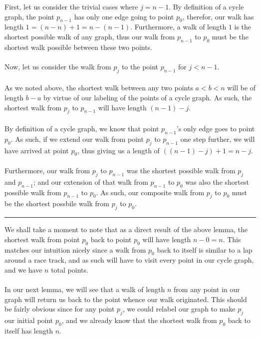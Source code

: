 \documentclass[a4paper,12pt]{article}
\begin{document}
First, let us consider the trivial cases where $j = n - 1$. By definition of a cycle graph, the point $p_{n-1}$ has only one edge going to point $p_0$, therefor, our walk has length $1 = (n - n) + 1 = n - (n - 1)$. Furthermore, a walk of length $1$ is the shortest possible walk of any graph, thus our walk from $p_{n-1}$ to $p_0$ must be the shortest walk possible between these two points.\\
\\ 
Now, let us consider the walk from $p_j$ to the point $p_{n-1}$ for $j < n - 1$.\\
\\
As we noted above, the shortest walk between any two points $a < b < n$ will be of length $b - a$ by virtue of our labeling of the points of a cycle graph. As such, the shortest walk from $p_j$ to $p_{n-1}$ will have length $(n - 1) - j$.\\
\\
By definition of a cycle graph, we know that point $p_{n-1}$'s only edge goes to point $p_0$. As such, if we extend our walk from point $p_j$ to $p_{n-1}$ one step further, we will have arrived at point $p_0$, thus giving us a length of $((n - 1) - j) + 1 = n - j$.\\
\\
Furthermore, our walk from $p_j$ to $p_{n-1}$ was the shortest possible walk from $p_j$ and $p_{n-1}$; and our extension of that walk from $p_{n-1}$ to $p_0$ was also the shortest possible walk from $p_{n-1}$ to $p_0$. As such, our composite walk from $p_j$ to $p_0$ must be the shortest possbile walk from $p_j$ to $p_0$.
\begin{center}
\noindent\rule{8cm}{0.4pt}
\end{center} 
\noindent
We shall take a moment to note that as a direct result of the above lemma, the shortest walk from point $p_0$ back to point $p_0$ will have length $n - 0 = n$. This matches our intuition nicely since a walk from $p_0$ back to itself is similar to a lap around a race track, and as such will have to visit every point in our cycle graph, and we have $n$ total points.\\
\\
In our next lemma, we will see that a walk of length $n$ from any point in our graph will return us back to the point whence our walk originated. This should be fairly obvious since for any point $p_j$, we could relabel our graph to make $p_j$ our initial point $p_0$, and we already know that the shortest walk from $p_0$ back to itself has length $n$.\\
\end{document}
